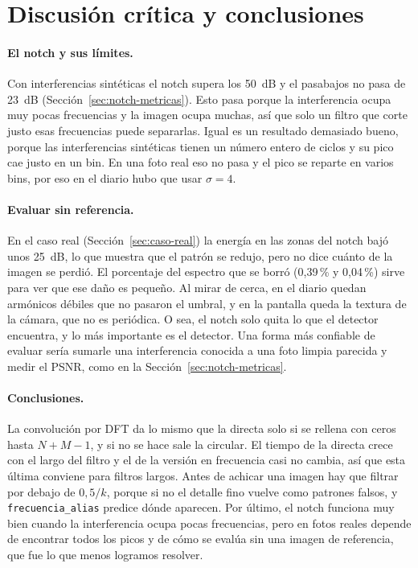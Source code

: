 %

\section{Discusión crítica y conclusiones}
\label{sec:conclusiones}

\paragraph{El notch y sus límites.} Con interferencias sintéticas el notch supera los 50~dB y el
pasabajos no pasa de 23~dB (Sección~\ref{sec:notch-metricas}). Esto pasa porque la
interferencia ocupa muy pocas frecuencias y la imagen ocupa muchas, así que solo un filtro que
corte justo esas frecuencias puede separarlas. Igual es un resultado demasiado bueno, porque las
interferencias sintéticas tienen un número entero de ciclos y su pico cae justo en un bin. En una
foto real eso no pasa y el pico se reparte en varios bins, por eso en el diario hubo que usar
$\sigma = 4$.

\paragraph{Evaluar sin referencia.} En el caso real (Sección~\ref{sec:caso-real}) la energía en las
zonas del notch bajó unos 25~dB, lo que muestra que el patrón se redujo, pero no dice cuánto de la
imagen se perdió. El porcentaje del espectro que se borró (0,39\,\% y 0,04\,\%) sirve para ver que
ese daño es pequeño. Al mirar de cerca, en el diario quedan armónicos débiles que no pasaron el
umbral, y en la pantalla queda la textura de la cámara, que no es periódica. O sea, el notch solo
quita lo que el detector encuentra, y lo más importante es el detector. Una forma más confiable de
evaluar sería sumarle una interferencia conocida a una foto limpia parecida y medir el PSNR, como en la Sección~\ref{sec:notch-metricas}.

\paragraph{Conclusiones.} La convolución por DFT da lo mismo que la directa solo si se rellena con
ceros hasta $N+M-1$, y si no se hace sale la circular. El tiempo de la directa crece con el largo
del filtro y el de la versión en frecuencia casi no cambia, así que esta última conviene para
filtros largos. Antes de achicar una imagen hay que filtrar por debajo de $0{,}5/k$, porque si no
el detalle fino vuelve como patrones falsos, y \texttt{frecuencia\_alias} predice dónde aparecen.
Por último, el notch funciona muy bien cuando la interferencia ocupa pocas frecuencias, pero en
fotos reales depende de encontrar todos los picos y de cómo se evalúa sin una imagen de
referencia, que fue lo que menos logramos resolver.
